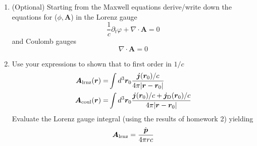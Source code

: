 \documentclass[12pt]{article}
\def\A{{\bm A}}
\def\pot{{\varphi}}
\def\p{{\bm p}}
\def\r{{\bm r}}
\def\v{{\bm v}}
\def\st{\begin{equation}}
\def\stp{\end{equation}}
\begin{document}
\begin{enumerate}



   \item (Optional) Starting from the Maxwell equations derive/write down  the equations for ($\phi,\A$)
   in the Lorenz gauge 
      \st
          \frac{1}{c} \partial_t \varphi + \nabla \cdot \A = 0 
      \stp
      and Coulomb gauges
      \st
          \nabla \cdot \A = 0 
      \stp

\item  Use your expressions to shown that to first order in $1/c$
   \begin{align}
       \A_{\rm lrnz}(\r) =&  \int d^3\r_0 \frac{{\bm j}(\r_0)/c }{4\pi |\r - \r_0|} \\
       \A_{\rm coul}(\r) =&  \int d^3\r_0 \frac{ {\bm j}(\r_0)/c + {\bm j}_{\rm D}(\r_0)/c}{4\pi |\r-\r_0|}
   \end{align}
   Evaluate the Lorenz gauge integral (using the results of homework 2)
      yielding
      \st
            \label{Aguess}
            {\bm A}_{\rm lrnz}  = \frac{\dot \p }{4\pi r c}
      \stp



\end{enumerate}
\end{document}
